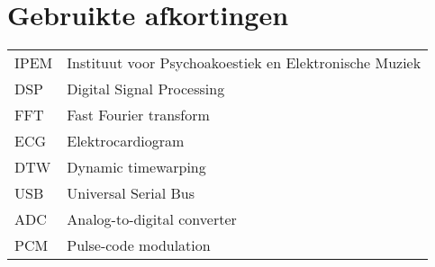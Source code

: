 \chapter{Gebruikte afkortingen}
\begin{flushleft}
	\renewcommand{\baselinestretch}{1.5}
	\small\normalsize
	\begin{longtable}{ll}
		IPEM				&  Instituut voor Psychoakoestiek en Elektronische Muziek \\
		DSP					&  Digital Signal Processing \\
		FFT					&  Fast Fourier transform \\
		ECG					&  Elektrocardiogram \\
		DTW					&  Dynamic timewarping \\
		USB					&  Universal Serial Bus \\
		ADC					&  Analog-to-digital converter \\
		PCM					&  Pulse-code modulation
	\end{longtable}
\end{flushleft}